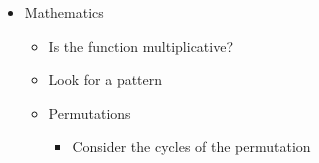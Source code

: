 \documentclass[8pt,a4paper,landscape,oneside]{amsart}
\newenvironment{myitemize}
{ \begin{itemize}[leftmargin=.5cm]
    \setlength{\itemsep}{0pt}
    \setlength{\parskip}{0pt}
    \setlength{\parsep}{0pt}     }
{ \end{itemize}                  }
\begin{document}
\begin{multicols*}{3}
\begin{myitemize}
\begin{itemize}
\begin{itemize}
                                \item Centers of the tree
                            \end{itemize}
                        \item Eulerian path/circuit
                        \item Chinese postman problem
                        \item Topological sort
                        \item (Min-Cost) Max Flow
                        \item Min Cut
                            \begin{itemize}
                                \item Maximum Density Subgraph
                            \end{itemize}
                        \item Huffman Coding
                        \item Min-Cost Arborescence
                        \item Steiner Tree
                        \item Kirchoff's matrix tree theorem
                        \item Pr\"ufer sequences
                        \item Lov\'asz Toggle
                        \item Look at the DFS tree (which has no cross-edges)
                        \item Is the graph a DFA or NFA?
                            \begin{itemize}
                                \item Is it the Synchronizing word problem?
                            \end{itemize}
                    \end{itemize}
                \item Mathematics
                    \begin{itemize}
                        \item Is the function multiplicative?
                        \item Look for a pattern
                        \item Permutations
                            \begin{itemize}
                                \item Consider the cycles of the permutation

\end{itemize}
\end{itemize}
\end{myitemize}
\end{multicols*}
\end{document}
